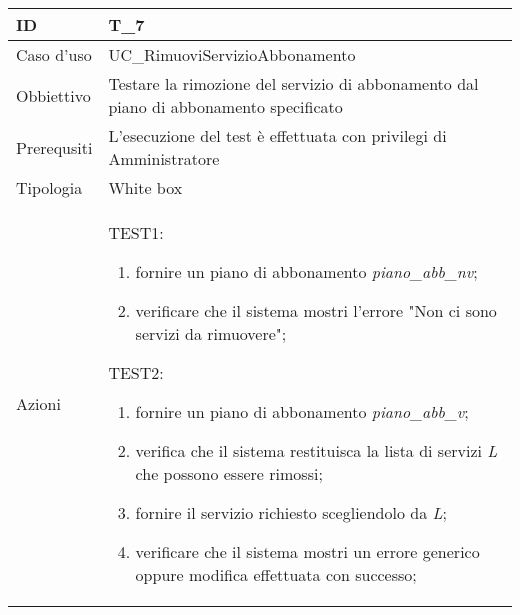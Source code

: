 \begin{table}[hb]
    \centering
    \begin{tabular}{ |p{2cm}|p{10cm}|  }
        \hline
        ID          & T\_7                                                                                  \\\hline
        Caso d'uso  & UC\_RimuoviServizioAbbonamento                                                        \\\hline
        Obbiettivo  & Testare la rimozione del servizio di abbonamento dal piano di abbonamento specificato \\\hline
        Prerequsiti & L'esecuzione del test è effettuata con privilegi di Amministratore                    \\\hline
        Tipologia   & White box                                                                             \\\hline
        Azioni      &
        TEST1:
        \begin{enumerate}[nosep, topsep=0pt]
            \item fornire un piano di abbonamento \emph{piano\_abb\_nv};
            \item verificare che il sistema mostri l'errore "Non ci sono servizi da rimuovere";
        \end{enumerate}
        \vspace{0.5cm} TEST2:
        \begin{enumerate}[nosep, topsep=0pt]
            \item fornire un piano di abbonamento \emph{piano\_abb\_v};
            \item verifica che il sistema restituisca la lista di servizi \emph{L} che possono essere rimossi;
            \item fornire il servizio richiesto scegliendolo da \emph{L};
            \item verificare che il sistema mostri un errore generico oppure modifica effettuata con successo;
        \end{enumerate}
        \\\hline
    \end{tabular}
\end{table}

